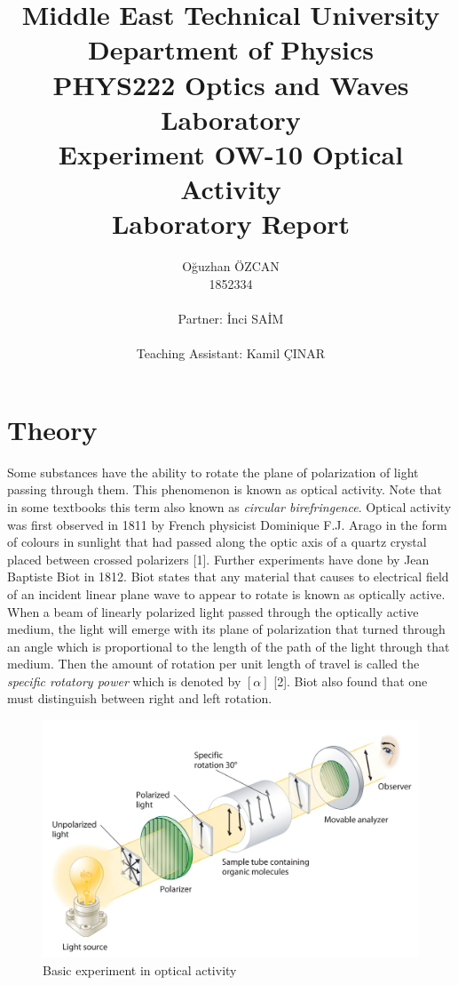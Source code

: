 \documentclass[a4paper,12pt]{report}
\title{Middle East Technical University\\Department of Physics\\PHYS222 Optics and Waves Laboratory\\\textbf{Experiment OW-10 Optical Activity\\Laboratory Report}}
\author{Oğuzhan ÖZCAN\\1852334\\\\Partner: İnci SAİM\\\\Teaching Assistant: Kamil ÇINAR}
\begin{document}
\maketitle
\tableofcontents
\listoffigures
\listoftables
\chapter{Theory}
Some substances have the ability to rotate the plane of polarization of light passing through  them. This phenomenon is known as optical activity. Note that in some textbooks this term also known as \textit{circular birefringence}. Optical activity was first observed in 1811 by French physicist Dominique F.J. Arago in the form of colours in sunlight that had passed along the optic axis of a quartz crystal placed between crossed polarizers [1]. Further experiments have done by Jean Baptiste Biot in 1812. Biot states that any material that causes to electrical field of an incident linear plane wave to appear to rotate is known as optically active. When a beam of linearly polarized light passed through the optically active medium, the light will emerge with its plane of polarization that turned through an angle which is proportional to the length of the path of the light through that medium. Then the amount of rotation per unit length of travel is called the \textit{specific rotatory power} which is denoted by $[\alpha]$ [2]. Biot also found that one must distinguish between right and left rotation. 
\begin{figure}[h]
\centering
\includegraphics[width=0.85\linewidth, height=0.30\textheight]{"optical system"}
\caption{Basic experiment in optical activity}
\label{fig:opticalsystem}
\end{figure}
\end{document}
